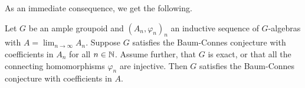 	As an immediate consequence, we get the following.
	\begin{kor}\label{Cor:InductiveLimit}
		Let $G$ be an ample groupoid and $(A_n,\varphi_n)_n$ an inductive sequence of $G$-algebras with $A=\lim_{n\rightarrow\infty}A_n$. Suppose $G$ satisfies the Baum-Connes conjecture with coefficients in $A_n$ for all $n\in\mathbb N$. Assume further, that $G$ is exact, or that all the connecting homomorphisms $\varphi_n$ are injective. Then $G$ satisfies the Baum-Connes conjecture with coefficients in $A$.
	\end{kor}